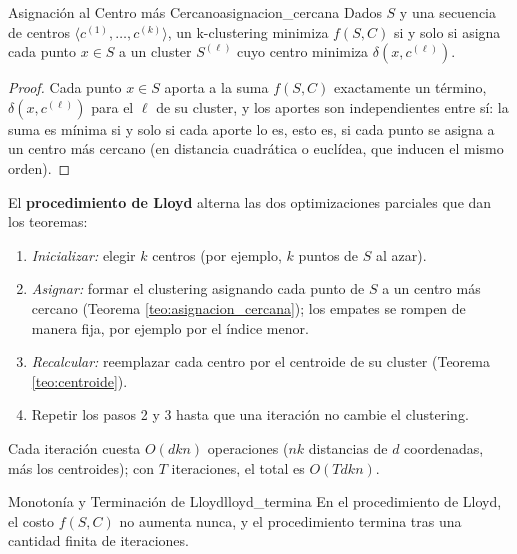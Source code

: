 \documentclass[11pt, a4paper]{article}
\begin{document}
\begin{teorema}{Asignación al Centro más Cercano}{asignacion_cercana}
Dados $S$ y una secuencia de centros $\langle c^{(1)}, \dots, c^{(k)} \rangle$, un k-clustering minimiza $f(S, C)$ si y solo si asigna cada punto $x \in S$ a un cluster $S^{(\ell)}$ cuyo centro minimiza $\delta(x, c^{(\ell)})$.
\end{teorema}

\begin{proof}
Cada punto $x \in S$ aporta a la suma $f(S, C)$ exactamente un término, $\delta(x, c^{(\ell)})$ para el $\ell$ de su cluster, y los aportes son independientes entre sí: la suma es mínima si y solo si cada aporte lo es, esto es, si cada punto se asigna a un centro más cercano (en distancia cuadrática o euclídea, que inducen el mismo orden).
\end{proof}

El \textbf{procedimiento de Lloyd} alterna las dos optimizaciones parciales que dan los teoremas:
\begin{enumerate}
    \item \textit{Inicializar:} elegir $k$ centros (por ejemplo, $k$ puntos de $S$ al azar).
    \item \textit{Asignar:} formar el clustering asignando cada punto de $S$ a un centro más cercano (Teorema \ref{teo:asignacion_cercana}); los empates se rompen de manera fija, por ejemplo por el índice menor.
    \item \textit{Recalcular:} reemplazar cada centro por el centroide de su cluster (Teorema \ref{teo:centroide}).
    \item Repetir los pasos 2 y 3 hasta que una iteración no cambie el clustering.
\end{enumerate}
Cada iteración cuesta $O(dkn)$ operaciones ($nk$ distancias de $d$ coordenadas, más los centroides); con $T$ iteraciones, el total es $O(T d k n)$.

\begin{proposicion}{Monotonía y Terminación de Lloyd}{lloyd_termina}
En el procedimiento de Lloyd, el costo $f(S, C)$ no aumenta nunca, y el procedimiento termina tras una cantidad finita de iteraciones.
\end{proposicion}
\end{document}
